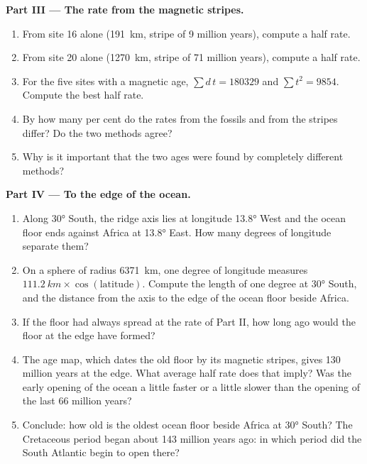 \begin{problem}
\medskip
\noindent\textbf{Part III --- The rate from the magnetic stripes.}
\begin{enumerate}[resume]
  \item From site 16 alone (\qty{191}{km}, stripe of 9 million years),
        compute a half rate.
  \item From site 20 alone (\qty{1270}{km}, stripe of 71 million years),
        compute a half rate.
  \item For the five sites with a magnetic age, $\sum d\,t = \num{180329}$ and
        $\sum t^2 = \num{9854}$. Compute the best half rate.
  \item By how many per cent do the rates from the fossils and from the
        stripes differ? Do the two methods agree?
  \item Why is it important that the two ages were found by completely
        different methods?
\end{enumerate}

\medskip
\noindent\textbf{Part IV --- To the edge of the ocean.}
\begin{enumerate}[resume]
  \item Along \ang{30} South, the ridge axis lies at longitude
        \ang{13.8} West and the ocean floor ends against Africa at
        \ang{13.8} East. How many degrees of longitude separate them?
  \item On a sphere of radius \qty{6371}{km}, one degree of longitude
        measures $\qty{111.2}{km} \times \cos(\text{latitude})$. Compute the
        length of one degree at \ang{30} South, and the distance from the
        axis to the edge of the ocean floor beside Africa.
  \item If the floor had always spread at the rate of Part II, how long ago
        would the floor at the edge have formed?
  \item The age map, which dates the old floor by its magnetic stripes, gives
        \num{130} million years at the edge. What average half rate does
        that imply? Was the early opening of the ocean a little faster or a
        little slower than the opening of the last 66 million years?
  \item Conclude: how old is the oldest ocean floor beside Africa at
        \ang{30} South? The Cretaceous period began about \num{143} million
        years ago: in which period did the South Atlantic begin to open
        there?
\end{enumerate}
\end{problem}
